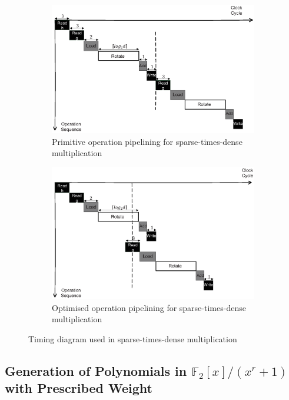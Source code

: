 \documentclass[preprint]{iacrtrans}
\begin{document}
\begin{figure}[!tb]
\centering
\begin{subfigure}[t]{0.45\textwidth}\centering
\includegraphics[width=\textwidth]{./fig/pipeline_mul.eps}
\caption{Primitive operation pipelining for sparse-times-dense multiplication}
\label{fig:pipeline_mul}
\end{subfigure}
\hspace{1em}
\begin{subfigure}[t]{0.45\textwidth}\centering
\includegraphics[width=\textwidth]{./fig/pipeline_mul2.eps}
\caption{Optimised operation pipelining for sparse-times-dense multiplication }
\label{fig:pipeline_mul2}
\end{subfigure}
\caption{Timing diagram used in sparse-times-dense multiplication}
\end{figure}

\subsection{Generation of Polynomials in $\mathbb{F}_2[x]/(x^r+1)$ with Prescribed Weight}
\end{document}

